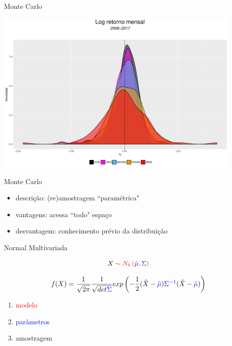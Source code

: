 \documentclass{beamer}
\begin{document}
\begin{frame}{Monte Carlo}

\begin{center}
 \includegraphics[height=8cm,keepaspectratio]{decritiva_indices.pdf}
 \end{center}

\end{frame}



\begin{frame}{Monte Carlo}

\begin{itemize}
\item descrição: (re)amostragem ``paramétrica"
\item vantagens: acessa ``todo" espaço
\item desvantagem: conhecimento prévio da distribuição
\end{itemize}

\end{frame}


\begin{frame}{Normal Multivariada}

\begin{equation*}
X \color{red}\sim N_k\left(\color{blue}\tilde{\mu}\color{red},\color{blue}\Sigma\color{red}\right)
\end{equation*}



\begin{equation*}
f(X) = \frac{1}{\sqrt{2\pi}}\frac{1}{\sqrt{det \color{blue}\Sigma}}exp\left(-\frac{1}{2}(\tilde{X}-\color{blue}\tilde{\mu}\color{black})\color{blue}\Sigma^{-1}\color{black}(\tilde{X}-\color{blue}\tilde{\mu}\color{black})\right)
\end{equation*}


\begin{enumerate}
\item \textcolor{red}{modelo}
\item \textcolor{blue}{parâmetros}
\item amostragem
\end{enumerate}


\end{frame}
\end{document}
